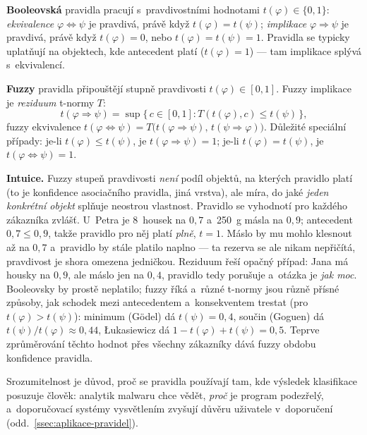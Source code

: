 \documentclass[11pt,a4paper]{article}
\theoremstyle{definition}
\begin{document}
\begin{defbox}
\textbf{Booleovská} pravidla pracují s~pravdivostními hodnotami $t(\varphi)\in\{0,1\}$:
\emph{ekvivalence} $\varphi\Leftrightarrow\psi$ je pravdivá, právě když
$t(\varphi)=t(\psi)$; \emph{implikace} $\varphi\Rightarrow\psi$ je pravdivá, právě když
$t(\varphi)=0$, nebo $t(\varphi)=t(\psi)=1$. Pravidla se typicky uplatňují na objektech,
kde antecedent platí ($t(\varphi)=1$) --- tam implikace splývá s~ekvivalencí.

\textbf{Fuzzy} pravidla připouštějí stupně pravdivosti $t(\varphi)\in[0,1]$. Fuzzy
implikace je \emph{reziduum} t-normy $T$:
\[ t(\varphi\Rightarrow\psi)=\sup\{\,c\in[0,1]: T(t(\varphi),c)\le t(\psi)\,\}, \]
fuzzy ekvivalence $t(\varphi\Leftrightarrow\psi)
=T\big(t(\varphi\Rightarrow\psi),\,t(\psi\Rightarrow\varphi)\big)$. Důležité speciální
případy: je-li $t(\varphi)\le t(\psi)$, je $t(\varphi\Rightarrow\psi)=1$; je-li
$t(\varphi)=t(\psi)$, je $t(\varphi\Leftrightarrow\psi)=1$.
\end{defbox}

\textbf{Intuice.} Fuzzy stupeň pravdivosti \emph{není} podíl objektů, na kterých
pravidlo platí (to je konfidence asociačního pravidla, jiná vrstva), ale míra, do jaké
\emph{jeden konkrétní objekt} splňuje neostrou vlastnost. Pravidlo  se vyhodnotí pro každého zákazníka
zvlášť. U~Petra je 8~housek  na $0{,}7$ a~250~g másla  na $0{,}9$;
antecedent $0{,}7 \le 0{,}9$, takže pravidlo pro něj platí \emph{plně}, $t = 1$. Máslo by
mu mohlo klesnout až na $0{,}7$ a~pravidlo by stále platilo naplno --- ta rezerva se ale
nikam nepřičítá, pravdivost je shora omezena jedničkou. Reziduum řeší opačný případ:
Jana má housky  na $0{,}9$, ale máslo jen na $0{,}4$, pravidlo tedy porušuje
a~otázka je \emph{jak moc}. Booleovsky by prostě neplatilo; fuzzy říká 
a~různé t-normy jsou různě přísné způsoby, jak schodek mezi antecedentem a~konsekventem
trestat (pro $t(\varphi) > t(\psi)$): minimum (Gödel) dá $t(\psi) = 0{,}4$, součin
(Goguen) dá $t(\psi)/t(\varphi) \approx 0{,}44$, Łukasiewicz dá
$1 - t(\varphi) + t(\psi) = 0{,}5$. Teprve zprůměrování těchto hodnot přes všechny
zákazníky dává fuzzy obdobu konfidence pravidla.

Srozumitelnost je důvod, proč se pravidla používají tam, kde výsledek klasifikace
posuzuje člověk: analytik malwaru chce vědět, \emph{proč} je program podezřelý,
a~doporučovací systémy vysvětlením zvyšují důvěru uživatele v~doporučení
(odd.~\ref{ssec:aplikace-pravidel}).
\end{document}
